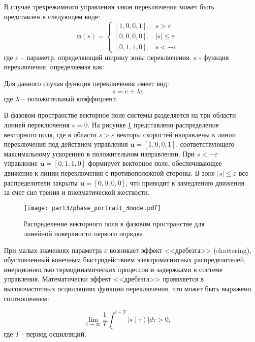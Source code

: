В случае трехрежимного управления закон переключения может быть представлен в следующем виде:
\begin{equation}
	\mathbf{u}(s) = \begin{cases}
		[1,0,0,1], & s > \varepsilon      \\
		[0,0,0,0], & |s| \leq \varepsilon \\
		[0,1,1,0], & s < -\varepsilon
	\end{cases}
\end{equation}
где $\varepsilon$ -- параметр, определяющий ширину зоны переключения, $s$ - функция переключения, определяемая как:

Для данного случая функция переключения имеет вид:
\begin{equation}
	s = \dot{e} + \lambda e
\end{equation}
где $\lambda$ -- положительный коэффициент.

В фазовом пространстве векторное поле системы разделяется на три области линией
переключения $s = 0$. На рисунке \ref{fig:vector_field_linear} представлено
распределение векторного поля, где в области $s > \varepsilon$ векторы
скоростей направлены к линии переключения под действием
управления $\mathbf{u} = [1,0,0,1]$, соответствующего максимальному ускорению в положительном
направлении. При $s < -\varepsilon$ управление $\mathbf{u} = [0,1,1,0]$ формирует
векторное поле, обеспечивающее движение к линии переключения с противоположной
стороны. В зоне $|s| \leq \varepsilon$ все распределители закрыты $\mathbf{u} = [0,0,0,0]$,
что приводит к замедлению движения за счет сил трения и пневматической жесткости.
\begin{figure}[h]
	\centering
	\texttt{[image: part3/phase\_portrait\_3mode.pdf]}
	\caption{Распределение векторного поля в фазовом пространстве для линейной поверхности первого порядка}
	\label{fig:vector_field_linear}
\end{figure}

При малых значениях параметра $\varepsilon$ возникает эффект <<дребезга>> (chattering),
обусловленный конечным быстродействием электромагнитных распределителей,
инерционностью термодинамических процессов и задержками в системе управления.
Математически эффект <<дребезга>> проявляется в высокочастотных осцилляциях функции
переключения, что может быть выражено соотношением:

\begin{equation}
	\lim_{t \to \infty} \frac{1}{T}\int_t^{t+T} |s(\tau)| d\tau > 0,
\end{equation}
где $T$ - период осцилляций.

